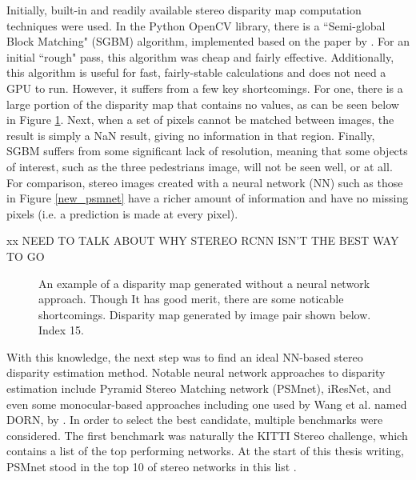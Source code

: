 Initially, built-in and readily available stereo disparity map computation techniques were used. In the Python OpenCV library, there is a ``Semi-global Block Matching" (SGBM) algorithm, implemented based on the paper by \cite{hirschmuller2007stereo}. For an initial ``rough" pass, this algorithm was cheap and fairly effective. Additionally, this algorithm is useful for fast, fairly-stable calculations and does not need a GPU to run. However, it suffers from a few key shortcomings. For one, there is a large portion of the disparity map that contains no values, as can be seen below in Figure \ref{ind15_SGBM_comparison}. Next, when a set of pixels cannot be matched between images, the result is simply a NaN result, giving no information in that region. Finally, SGBM suffers from some significant lack of resolution, meaning that some objects of interest, such as the three pedestrians image, will not be seen well, or at all. For comparison, stereo images created with a neural network (NN) such as those in Figure \ref{new_psmnet} have a richer amount of information and have no missing pixels (i.e. a prediction is made at every pixel). 

xx NEED TO TALK ABOUT WHY STEREO RCNN ISN'T THE BEST WAY TO GO


\begin{figure}[h]
    \centering
    \caption{An example of a disparity map generated without a neural network approach. Though It has good merit, there are some noticable shortcomings. Disparity map generated by image pair shown below. Index 15.}
    \label{ind15_SGBM_comparison}
\end{figure}


With this knowledge, the next step was to find an ideal NN-based stereo disparity estimation method. Notable neural network approaches to disparity estimation include Pyramid Stereo Matching network (PSMnet),  iResNet, and even some monocular-based approaches including one used by Wang et al. named DORN, by  \cite{DBLP:journals/corr/abs-1806-02446}. In order to select the best candidate, multiple benchmarks were considered. The first benchmark was naturally the KITTI Stereo challenge, which contains a list of the top performing networks. At the start of this thesis writing, PSMnet stood in the top 10 of stereo networks in this list \cite{menze_kitti_2019}. 

